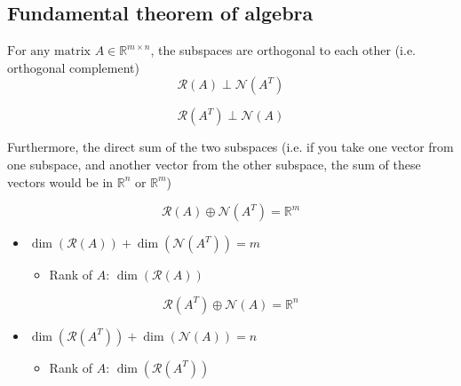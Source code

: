 \subsection{Fundamental theorem of algebra}
\begin{definition}
    $\text{For any matrix } A \in \mathbb{R}^{m \times n}$, the subspaces are orthogonal to each other (i.e. orthogonal complement)
    \begin{equation}
        \mathcal{R}(A) \perp \mathcal{N}(A^T)
    \end{equation}

    \begin{equation}
    \mathcal{R}(A^T) \perp \mathcal{N}(A)
    \end{equation}

    Furthermore, the direct sum of the two subspaces (i.e. if you take one vector from one subspace, and another vector from the other subspace, the sum of these vectors would be in $\mathbb{R}^n$ or $\mathbb{R}^m$)

    \begin{equation}
    \mathcal{R}(A) \oplus \mathcal{N}(A^T) = \mathbb{R}^m
    \end{equation}
    \begin{itemize}
        \item $\dim(\mathcal{R}(A)) + \dim(\mathcal{N}(A^T)) = m$
        \begin{itemize}
            \item Rank of $A$: $\dim(\mathcal{R}(A))$
        \end{itemize}
    \end{itemize}

    \begin{equation}
    \mathcal{R}(A^T) \oplus \mathcal{N}(A) = \mathbb{R}^n
    \end{equation}
    \begin{itemize}
        \item $\dim(\mathcal{R}(A^T)) + \dim(\mathcal{N}(A)) = n$
        \begin{itemize}
            \item Rank of $A$: $\dim(\mathcal{R}(A^T))$
        \end{itemize}
    \end{itemize}
\end{definition}

